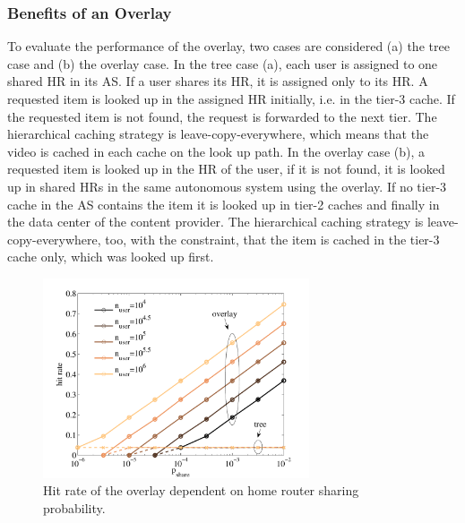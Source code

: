 \subsubsection{Benefits of an Overlay}

To evaluate the performance of the overlay, two cases are considered (a) the tree case and (b) the overlay case. In the tree case (a), each user is assigned to one shared HR in its AS. If a user shares its HR, it is assigned only to its HR. A requested item is looked up in the assigned HR initially, i.e. in the tier-3 cache. If the requested item is not found, the request is forwarded to the next tier. The hierarchical caching strategy is leave-copy-everywhere, which means that the video is cached in each cache on the look up path. In the overlay case (b), a requested item is looked up in the HR of the user, if it is not found, it is looked up in shared HRs in the same autonomous system using the overlay. If no tier-3 cache in the AS contains the item it is looked up in tier-2 caches and finally in the data center of the content provider. The hierarchical caching strategy is leave-copy-everywhere, too, with the constraint, that the item is cached in the tier-3 cache only, which was looked up first.

\begin{figure}[tb]
  \centering
  \includegraphics[width=0.7\textwidth]{hierarchical/simulative/figures/overlay_nuser_hitrate}
  \caption{Hit rate of the overlay dependent on home router sharing probability.}
  \label{fig:overlay_nuser_hitrate}
\end{figure}

